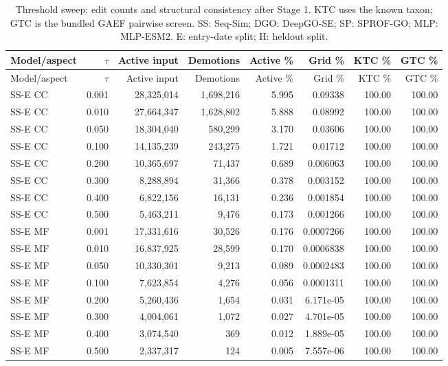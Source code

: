 \begingroup\scriptsize
\setlength{\tabcolsep}{4pt}
\begin{longtable}{lrrrrrrr}
\caption{Threshold sweep: edit counts and structural consistency after Stage 1. KTC uses the known taxon; GTC is the bundled GAEF pairwise screen. SS: Seq-Sim; DGO: DeepGO-SE; SP: SPROF-GO; MLP: MLP-ESM2. E: entry-date split; H: heldout split.}\label{tab:supp-threshold-flips}\\
\toprule
Model/aspect & $\tau$ & Active input & Demotions & Active \% & Grid \% & KTC \% & GTC \% \\
\midrule
\endfirsthead
\toprule
Model/aspect & $\tau$ & Active input & Demotions & Active \% & Grid \% & KTC \% & GTC \% \\
\midrule
\endhead
SS-E CC & 0.001 & 28,325,014 & 1,698,216 & 5.995 & 0.09338 & 100.00 & 100.00 \\
SS-E CC & 0.010 & 27,664,347 & 1,628,802 & 5.888 & 0.08992 & 100.00 & 100.00 \\
SS-E CC & 0.050 & 18,304,040 & 580,299 & 3.170 & 0.03606 & 100.00 & 100.00 \\
SS-E CC & 0.100 & 14,135,239 & 243,275 & 1.721 & 0.01712 & 100.00 & 100.00 \\
SS-E CC & 0.200 & 10,365,697 & 71,437 & 0.689 & 0.006063 & 100.00 & 100.00 \\
SS-E CC & 0.300 & 8,288,894 & 31,366 & 0.378 & 0.003152 & 100.00 & 100.00 \\
SS-E CC & 0.400 & 6,822,156 & 16,131 & 0.236 & 0.001854 & 100.00 & 100.00 \\
SS-E CC & 0.500 & 5,463,211 & 9,476 & 0.173 & 0.001266 & 100.00 & 100.00 \\
SS-E MF & 0.001 & 17,331,616 & 30,526 & 0.176 & 0.0007266 & 100.00 & 100.00 \\
SS-E MF & 0.010 & 16,837,925 & 28,599 & 0.170 & 0.0006838 & 100.00 & 100.00 \\
SS-E MF & 0.050 & 10,330,301 & 9,213 & 0.089 & 0.0002483 & 100.00 & 100.00 \\
SS-E MF & 0.100 & 7,623,854 & 4,276 & 0.056 & 0.0001311 & 100.00 & 100.00 \\
SS-E MF & 0.200 & 5,260,436 & 1,654 & 0.031 & 6.171e-05 & 100.00 & 100.00 \\
SS-E MF & 0.300 & 4,004,061 & 1,072 & 0.027 & 4.701e-05 & 100.00 & 100.00 \\
SS-E MF & 0.400 & 3,074,540 & 369 & 0.012 & 1.889e-05 & 100.00 & 100.00 \\
SS-E MF & 0.500 & 2,337,317 & 124 & 0.005 & 7.557e-06 & 100.00 & 100.00 \\

\end{longtable}
